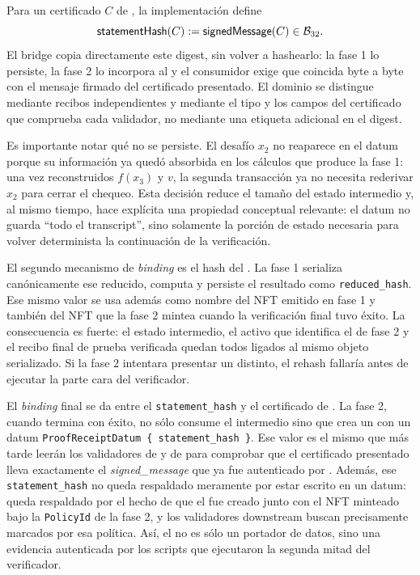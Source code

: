 \begin{definition}
\label{def:mithril-statement-hash}
\normalfont
Para un certificado $C$ de \Mithril, la implementación define
$$\mathsf{statementHash}(C):=\mathsf{signedMessage}(C)\in\mathcal{B}_{32}.$$
El bridge copia directamente este digest, sin volver a hashearlo: la fase 1 lo persiste, la fase 2 lo incorpora al \ProofReceipt y el consumidor exige que coincida byte a byte con el mensaje firmado del certificado presentado. El dominio se distingue mediante recibos independientes y mediante el tipo y los campos del certificado que comprueba cada validador, no mediante una etiqueta adicional en el digest.
\end{definition}

Es importante notar qué no se persiste. El desafío $x_2$ no reaparece en el datum porque su información ya quedó absorbida en los cálculos que produce la fase 1: una vez reconstruidos $f(x_3)$ y $v$, la segunda transacción ya no necesita rederivar $x_2$ para cerrar el chequeo. Esta decisión reduce el tamaño del estado intermedio y, al mismo tiempo, hace explícita una propiedad conceptual relevante: el datum no guarda ``todo el transcript'', sino solamente la porción de estado necesaria para volver determinista la continuación de la verificación.

El segundo mecanismo de \textit{binding} es el hash del \ReducedRedeemer. La fase 1 serializa canónicamente ese \redeemer reducido, computa \BLAKETwoSTwoFiveSix y persiste el resultado como \texttt{reduced\_hash}. Ese mismo valor se usa además como nombre del NFT emitido en fase 1 y también del NFT que la fase 2 mintea cuando la verificación final tuvo éxito. La consecuencia es fuerte: el estado intermedio, el activo que identifica el \UTxO de fase 2 y el recibo final de prueba verificada quedan todos ligados al mismo objeto serializado. Si la fase 2 intentara presentar un \ReducedRedeemer distinto, el rehash fallaría antes de ejecutar la parte cara del verificador.

El \textit{binding} final se da entre el \texttt{statement\_hash} y el certificado de \Mithril. La fase 2, cuando termina con éxito, no sólo consume el \UTxO intermedio sino que crea un \ProofReceipt con un datum \texttt{ProofReceiptDatum \{ statement\_hash \}}. Ese valor es el mismo que más tarde leerán los validadores de \StakeDistribution y de \MintTx para comprobar que el certificado presentado lleva exactamente el \textit{signed\_message} que ya fue autenticado por \MidnightSTMCircuit. Además, ese \texttt{statement\_hash} no queda respaldado meramente por estar escrito en un datum: queda respaldado por el hecho de que el \UTxO fue creado junto con el NFT minteado bajo la \texttt{PolicyId} de la fase 2, y los validadores downstream buscan precisamente \ProofReceipt marcados por esa política. Así, el \ProofReceipt no es sólo un portador de datos, sino una evidencia autenticada por los scripts que ejecutaron la segunda mitad del verificador.

